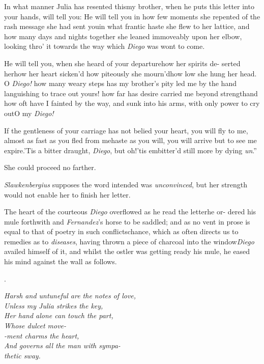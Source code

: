 \documentclass{article}
\begin{document}
\indent\lqq In what manner Julia has resented\break
\lqq this\tsk my brother, when he puts this\break
\lqq letter into your hands, will tell you:\break
\lqq He will tell you in how few moments\break
\lqq she repented of the rash message she\break
\lqq had sent you\tsk in what frantic haste\break
\lqq she flew to her lattice, and how many\break
\lqq days and nights together she leaned\break
\lqq immoveably upon her elbow, looking\break
\lqq thro’ it towards the way which \textit{Diego}\break
\lqq was wont to come.\hfill

\indent\lqq He will tell you, when she heard\break
\lqq of your departure\tsk how her spirits de-\break
\lqq serted her\tsk how her heart sicken’d\tsk\break
\lqq how piteously she mourn’d\tsh how low\break
\lqq she hung her head. O \textit{Diego!} how\break
\lqq many weary steps has my brother’s\break
\lqq pity led me by the hand languishing\break
\lqq to trace out yours! how far has desire\break
\lqq carried me beyond strength\tsh and how
\lqq oft have I fainted by the way, and\break
\lqq sunk into his arms, with only power\break
\lqq to cry out\tsk O my \textit{Diego!}

\indent\lqq If the gentleness of your carriage\break
\lqq has not belied your heart, you will fly\break
\lqq to me, almost as fast as you fled from\break
\lqq me\tsk haste as you will, you will arrive\break
\lqq but to see me expire.\tsk ’Tis a bitter\break
\lqq draught, \textit{Diego}, but oh!\@ ’tis embitter’d\break
\lqq still more by dying \textit{un}\tsh.”

She could proceed no farther.

\textit{Slawkenbergius} supposes the word intended was
\textit{unconvinced}, but her strength would not enable her to finish her
letter.

The heart of the courteous \textit{Diego}\break
overflowed as he read the letter\tsk he or-\break
dered his mule forthwith and
\textit{Fernandez}’s horse
to be saddled; and as no vent in
prose is equal to that of poetry in such
conflicts\tsk chance, which as often directs us to
remedies as to \textit{diseases}, having thrown a piece of charcoal
into the window\tsh \textit{Diego} availed himself of it,
and whilst the ostler was getting ready his mule, he eased his
mind against the wall as follows.

\bigskip
\centerline{.}
\parskip
\bgroup\itshape\noindent
\null\quad Harsh and untuneful are the notes of love,\\
\null\qquad Unless my Julia strikes the key,\\
\null\quad Her hand alone can touch the part,\\
\null\qquad Whose dulcet move-\\
\null\quad -\sic ment charms the heart,\\
\null\qquad And governs all the man with sympa-\\
\null\qquad\quad thetic sway.
\par\egroup
\end{document}
